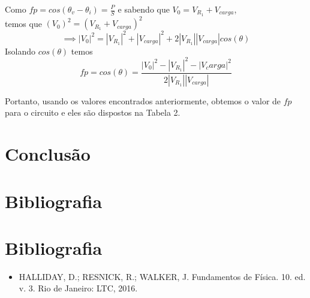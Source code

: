 \documentclass[a4 paper]{article}
\begin{document}
Como $fp=cos(\theta_v-\theta_i)=\frac{P}{S}$ e sabendo que $V_0=V_{R_1}+V_{carga}$, \\temos que $(V_0)^2=(V_{R_1}+V_{carga})^2$
\[\implies|V_0|^2=|V_{R_1}|^2 + |V_{carga}|^2+2|V_{R_1}||V_{carga}|cos(\theta)\]
Isolando $cos(\theta)$ temos 
\[fp = cos(\theta)= \frac{|V_0|^2-|V_{R_1}|^2-|V_carga|^2}{2|V_{R_1}||V_{carga}|}\]

Portanto, usando os valores encontrados anteriormente, obtemos o valor de $fp$ para o circuito e eles são dispostos na Tabela 2.




\section{Conclusão}

\section{Bibliografia}

\section{Bibliografia}

\begin{itemize}
\item HALLIDAY, D.; RESNICK, R.; WALKER, J. Fundamentos de Física. 10. ed. v. 3. Rio de Janeiro: LTC, 2016.
\end{itemize}
\end{document}

